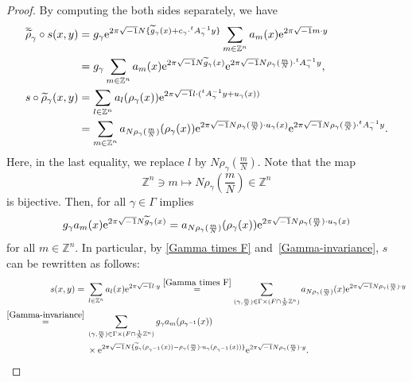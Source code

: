 \documentclass[10pt,a4paper]{amsart}
\numberwithin{equation}{section}
\newcommand{\Z}{\mathbb{Z}}
\renewcommand{\tilde}{\widetilde}
\newcommand{\vardbtilde}[1]{\tilde{\raisebox{0pt}[0.85\height]{$\tilde{#1}$}}}
\begin{document}
\begin{proof}
By computing the both sides separately, we have
\begin{align*}%
{\vardbtilde \rho}_\gamma\circ s (x,y)&=g_\gamma {\rm e}^{2\pi\sqrt{-1}N \{{\tilde g}_\gamma (x)+c_\gamma\cdot {}^tA_\gamma^{-1}y \}}\sum_{m\in \Z^n}a_m(x){\rm e}^{2\pi\sqrt{-1}m\cdot y} \\
&=g_\gamma\sum_{m\in \Z^n}a_m(x){\rm e}^{2\pi\sqrt{-1}N{\tilde g}_\gamma (x)}{\rm e}^{2\pi\sqrt{-1}N\rho_{\gamma} (\frac{m}{N} )\cdot {}^tA_\gamma^{-1}y},\\
s\circ {\tilde \rho}_\gamma(x,y)&=\sum_{l\in \Z^n}a_l (\rho_\gamma(x) ){\rm e}^{2\pi\sqrt{-1}l\cdot ({}^tA_\gamma^{-1}y+u_\gamma(x) )} \\
&=\sum_{m\in \Z^n}a_{N\rho_{\gamma} (\frac{m}{N} )} (\rho_\gamma(x) ){\rm e}^{2\pi\sqrt{-1}N\rho_{\gamma} (\frac{m}{N} )\cdot u_\gamma(x)}{\rm e}^{2\pi\sqrt{-1}N\rho_{\gamma} (\frac{m}{N} )\cdot {}^tA_\gamma^{-1}y}.
\end{align*}
Here, in the last equality, we replace $l$ by $N\rho_{\gamma}(\frac{m}{N})$. Note that the map
\[
\Z^n\ni m\mapsto N\rho_{\gamma}\left(\frac{m}{N}\right)\in \Z^n
\]
 is bijective. Then, \smash{${\vardbtilde \rho}_\gamma\circ s=s\circ {\tilde \rho}_\gamma$} for all $\gamma\in \Gamma$ implies
\[
g_\gamma a_m(x){\rm e}^{2\pi\sqrt{-1}N{\tilde g}_\gamma (x)}=a_{N\rho_{\gamma}(\frac{m}{N})}(\rho_\gamma(x)){\rm e}^{2\pi\sqrt{-1}N\rho_{\gamma}(\frac{m}{N})\cdot u_\gamma(x)}
\]
for all $m\in \Z^n$. In particular, by \eqref{Gamma times F} and~\eqref{Gamma-invariance}, $s$ can be rewritten as follows:
\begin{align*}
s(x,y)={}&\sum_{l\in \Z^n}a_l(x){\rm e}^{2\pi\sqrt{-1}l\cdot y} \stackrel{\eqref{Gamma times F}}{=}\sum_{(\gamma ,\frac{m}{N})\in \Gamma \times (F\cap \frac{1}{N}\Z^n)}a_{N\rho_{\gamma}(\frac{m}{N})}(x){\rm e}^{2\pi\sqrt{-1}N\rho_{\gamma}(\frac{m}{N})\cdot y} \\
\stackrel{\eqref{Gamma-invariance}}{=}{}&\sum_{ (\gamma ,\frac{m}{N} )\in \Gamma \times (F\cap \frac{1}{N}\Z^n )}g_{\gamma}a_m (\rho_{\gamma^{-1}}(x) )\\
&\times {\rm e}^{2\pi\sqrt{-1}N \{{\tilde g}_\gamma (\rho_{\gamma^{-1}}(x) )-\rho_{\gamma}(\frac{m}{N})\cdot u_{\gamma} (\rho_{\gamma^{-1}}(x) ) \}}{\rm e}^{2\pi\sqrt{-1}N\rho_{\gamma}(\frac{m}{N})\cdot y}.\tag*{\qed}
\end{align*} \renewcommand{\qed}{}
\end{proof}
\end{document}
